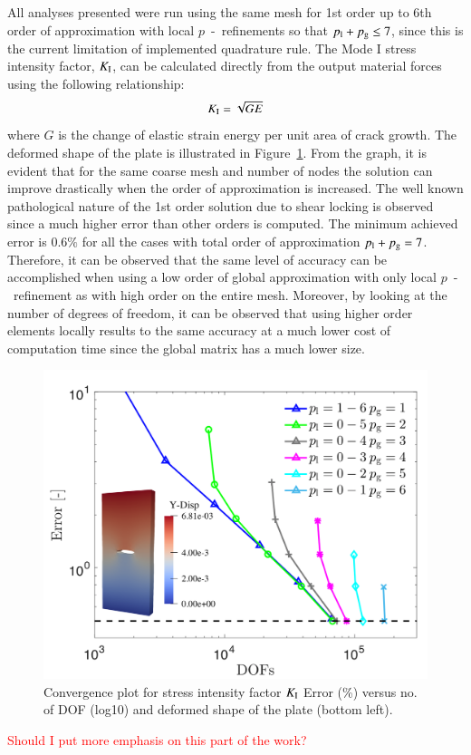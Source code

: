 \documentclass[11pt]{acmeArticle}
\numberwithin{equation}{section}
\begin{document}
All analyses presented were run using the same mesh for 1st order up to 6th order of approximation with local $p$~-~refinements so that $p_{\rm l} + p_{\rm g} \leq 7$, since this is the current limitation of implemented quadrature rule. 
The Mode I stress intensity factor, $K_{\rm I}$, can be calculated directly from the output material forces using the following relationship: 
\begin{equation}
K_{\rm I} = \sqrt{GE}
\end{equation}
where $G$ is the change of elastic strain energy per unit area of crack growth.
The deformed shape of the plate is illustrated in Figure~\ref{fig:plate_conv_no_sing}.
From the graph, it is evident that for the same coarse mesh and number of nodes the solution can improve drastically when the order of approximation is increased. 
The well known pathological nature of the 1st order solution due to shear locking is observed since a much higher error than other orders is computed. 
The minimum achieved error is $0.6\%$ for all the cases with total order of approximation  $p_{\rm l} + p_{\rm g} = 7$. 
Therefore, it can be observed that the same level of accuracy can be accomplished when using a low order of global approximation with only local $p$~-~refinement as with high order on the entire mesh. 
Moreover, by looking at the number of degrees of freedom, it can be observed that using higher order elements locally results to the same accuracy at a much lower cost of computation time since the global matrix has a much lower size.
\begin{figure}
	\centering
	\includegraphics[width=0.7\linewidth]{Figures/graphs/plate_conv_no_sing.png}
	\caption{Convergence plot for stress intensity factor $K_{\rm I}$ Error (\%) versus no. of DOF (log10) and deformed shape of the plate (bottom left).}
	\label{fig:plate_conv_no_sing}
\end{figure}
\textcolor{red}{Should I put more emphasis on this part of the work?}
\end{document}
